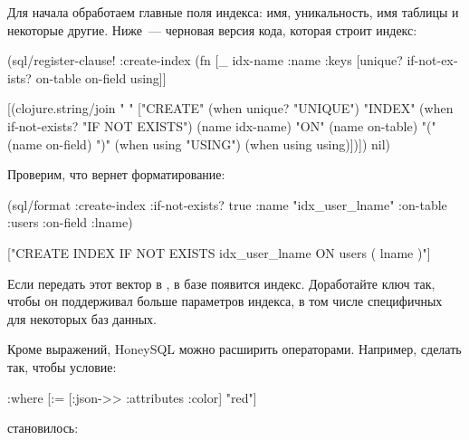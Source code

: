 Для начала обработаем главные поля индекса: имя, уникальность, имя таблицы и некоторые другие. Ниже~--- черновая версия кода, которая строит индекс:

\begin{english}
  \begin{clojure}
(sql/register-clause!
 :create-index
 (fn [_ {idx-name :name
         :keys [unique?
                if-not-exists?
                on-table
                on-field
                using]}]

   [(clojure.string/join
     " "
     ["CREATE"
      (when unique? "UNIQUE")
      "INDEX"
      (when if-not-exists? "IF NOT EXISTS")
      (name idx-name)
      "ON"
      (name on-table)
      "(" (name on-field) ")"
      (when using "USING")
      (when using using)])])
 nil)
  \end{clojure}
\end{english}

Проверим, что вернет форматирование:

\begin{english}
  \begin{clojure}
(sql/format {:create-index
              {:if-not-exists? true
               :name "idx_user_lname"
               :on-table :users
               :on-field :lname}})

["CREATE INDEX IF NOT EXISTS idx_user_lname
  ON users ( lname )"]
  \end{clojure}
\end{english}

Если передать этот вектор в , в базе появится индекс. Доработайте ключ  так, чтобы он поддерживал больше параметров индекса, в том числе специфичных для некоторых баз данных.

Кроме выражений, HoneySQL можно расширить операторами. Например, сделать так, чтобы условие:

\begin{english}
  \begin{clojure}
{:where [:= [:json->> :attributes :color] "red"]}
  \end{clojure}
\end{english}

\noindent
становилось:

\begin{english}
  \begin{clojure}
["... WHERE attributes ->> 'color' = ?" "red"]
  \end{clojure}
\end{english}

